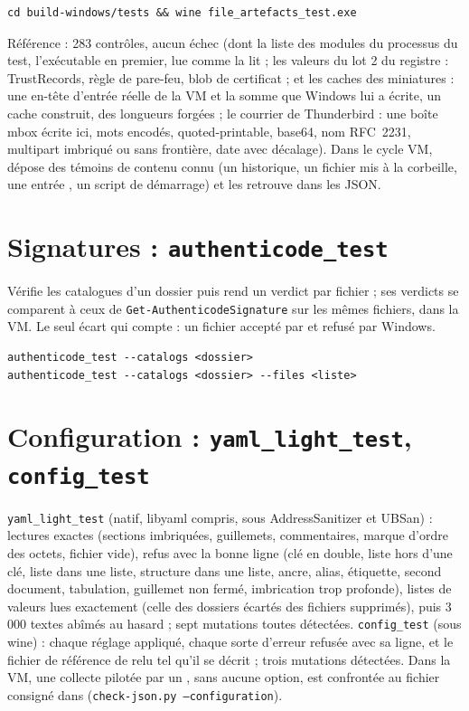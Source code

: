 \documentclass[11pt,a4paper,oneside]{report}
\begin{document}
\begin{lstlisting}
cd build-windows/tests && wine file_artefacts_test.exe
\end{lstlisting}

Référence : 283 contrôles, aucun échec (dont la liste des modules du
processus du test, l'exécutable en premier, lue comme \wac{} la lit ; les valeurs du lot 2 du registre : TrustRecords, règle de pare-feu, blob de certificat ; et les caches des miniatures : une en-tête d'entrée réelle de la VM et la somme que Windows lui a écrite, un cache construit, des longueurs forgées ; le courrier de Thunderbird : une boîte mbox écrite ici, mots encodés, quoted-printable, base64, nom RFC~2231, multipart imbriqué ou sans frontière, date avec décalage). Dans le cycle VM,
 dépose des témoins de contenu connu (un
historique, un fichier mis à la corbeille, une entrée , un
script de démarrage) et  les retrouve dans les JSON.

\section{Signatures : \texttt{authenticode\_test}}

Vérifie les catalogues d'un dossier puis rend un verdict par fichier ; ses
verdicts se comparent à ceux de \texttt{Get-AuthenticodeSignature} sur les mêmes
fichiers, dans la VM. Le seul écart qui compte : un fichier accepté par \wac{}
et refusé par Windows.

\begin{lstlisting}
authenticode_test --catalogs <dossier>
authenticode_test --catalogs <dossier> --files <liste>
\end{lstlisting}

\section{Configuration : \texttt{yaml\_light\_test}, \texttt{config\_test}}

\texttt{yaml\_light\_test} (natif, libyaml compris, sous AddressSanitizer et
UBSan) : lectures exactes (sections imbriquées, guillemets, commentaires,
marque d'ordre des octets, fichier vide), refus avec la bonne ligne (clé en
double, liste hors d'une clé, liste dans une liste, structure dans une liste,
ancre, alias, étiquette, second document, tabulation, guillemet non fermé,
imbrication trop profonde), listes de valeurs lues exactement (celle des
dossiers écartés des fichiers supprimés), puis 3\,000 textes abîmés au hasard ;
sept mutations toutes détectées. \texttt{config\_test} (sous wine) : chaque
réglage appliqué, chaque sorte d'erreur refusée avec sa ligne, et le fichier
de référence de  relu tel qu'il se décrit ; trois mutations
détectées. Dans la VM, une collecte pilotée par un , sans
aucune option, est confrontée au fichier consigné dans
 (\texttt{check-json.py --configuration}).
\end{document}
